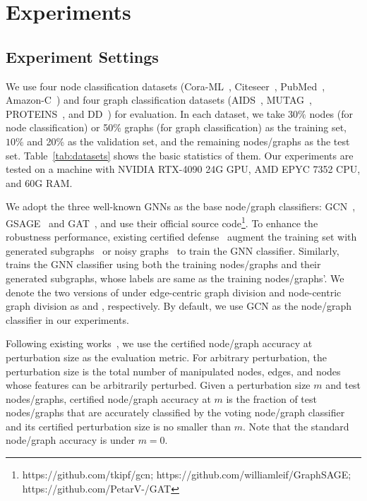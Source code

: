 \section{Experiments}
\label{sec:eval}


\subsection{Experiment Settings}

 We use four node classification datasets (Cora-ML~\cite{mccallum2000automating}, Citeseer~\cite{sen2008collective},  PubMed~\cite{sen2008collective}, Amazon-C~\cite{yang2021extract}) and four graph classification datasets (AIDS~\cite{riesen2008iam}, MUTAG~\cite{debnath1991structure}, PROTEINS~\cite{Borgwardt2005}, and DD~\cite{Dobson2003}) for evaluation. In each dataset, we take $30\%$ nodes (for node classification) or 50\% graphs (for graph classification) as the training set, $10\%$ and 20\% as the validation set, and the remaining nodes/graphs as the test set. 
Table~\ref{tab:datasets} shows the basic statistics of them. 
Our experiments are tested on a machine with NVIDIA RTX-4090 24G GPU, AMD EPYC 7352 CPU, and 60G RAM. 



\vspace{+0.05in}
We adopt the three well-known GNNs as the base node/graph classifiers: GCN~\cite{kipf2017semi}, GSAGE~\cite{hamilton2017inductive} and GAT~\cite{velivckovic2018graph}, and use their official source  code\footnote{https://github.com/tkipf/gcn; https://github.com/williamleif/GraphSAGE; https://github.com/PetarV-/GAT}.   
To enhance the robustness performance, existing certified defense~\cite{xia2024gnncert,lai2023nodeawarebismoothingcertifiedrobustness} augment the training set with generated subgraphs~\cite{xia2024gnncert} or noisy graphs~\cite{lai2023nodeawarebismoothingcertifiedrobustness} to train the GNN classifier.
Similarly, {\name} trains the GNN classifier using both the training nodes/graphs and their generated subgraphs, whose labels are same as the training nodes/graphs'. 
We denote the two versions of {\name} under edge-centric graph division and node-centric graph division as {\nameE} and {\nameN}, respectively. 
By default, we use GCN as the node/graph classifier in our experiments.

\vspace{+0.05in}
Following existing works~\cite{xia2024gnncert,lai2023nodeawarebismoothingcertifiedrobustness,wang2021certified}, we use the certified node/graph  accuracy at perturbation size as the evaluation metric. 
For arbitrary perturbation, the perturbation size is 
the total number of manipulated nodes, edges, and nodes whose features can be arbitrarily perturbed. 
Given a perturbation size $m$ and test nodes/graphs,  
certified node/graph accuracy at $m$ is the fraction of test nodes/graphs that are accurately classified by the voting node/graph classifier and its certified perturbation size is no smaller than $m$. 
Note that the standard node/graph accuracy is under $m=0$. 




